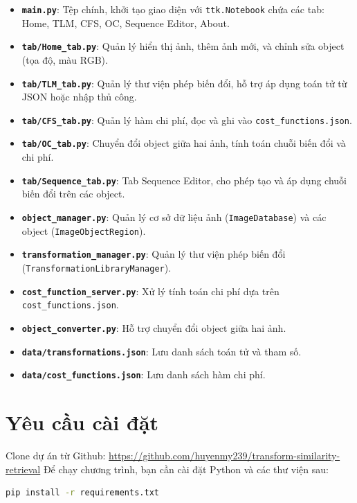 \documentclass[a4paper,12pt]{article}
\begin{document}
\begin{itemize}
    \item \textbf{\texttt{main.py}}: Tệp chính, khởi tạo giao diện với \texttt{ttk.Notebook} chứa các tab: Home, TLM, CFS, OC, Sequence Editor, About.
    \item \textbf{\texttt{tab/Home\_tab.py}}: Quản lý hiển thị ảnh, thêm ảnh mới, và chỉnh sửa object (tọa độ, màu RGB).
    \item \textbf{\texttt{tab/TLM\_tab.py}}: Quản lý thư viện phép biến đổi, hỗ trợ áp dụng toán tử từ JSON hoặc nhập thủ công.
    \item \textbf{\texttt{tab/CFS\_tab.py}}: Quản lý hàm chi phí, đọc và ghi vào \texttt{cost\_functions.json}.
    \item \textbf{\texttt{tab/OC\_tab.py}}: Chuyển đổi object giữa hai ảnh, tính toán chuỗi biến đổi và chi phí.
    \item \textbf{\texttt{tab/Sequence\_tab.py}}: Tab Sequence Editor, cho phép tạo và áp dụng chuỗi biến đổi trên các object.
    \item \textbf{\texttt{object\_manager.py}}: Quản lý cơ sở dữ liệu ảnh (\texttt{ImageDatabase}) và các object (\texttt{ImageObjectRegion}).
    \item \textbf{\texttt{transformation\_manager.py}}: Quản lý thư viện phép biến đổi (\texttt{TransformationLibraryManager}).
    \item \textbf{\texttt{cost\_function\_server.py}}: Xử lý tính toán chi phí dựa trên \texttt{cost\_functions.json}.
    \item \textbf{\texttt{object\_converter.py}}: Hỗ trợ chuyển đổi object giữa hai ảnh.
    \item \textbf{\texttt{data/transformations.json}}: Lưu danh sách toán tử và tham số.
    \item \textbf{\texttt{data/cost\_functions.json}}: Lưu danh sách hàm chi phí.
\end{itemize}

\section{Yêu cầu cài đặt}
Clone dự án từ Github: \href{https://github.com/huyenmy239/transform-similarity-retrieval}{https://github.com/huyenmy239/transform-similarity-retrieval}
Để chạy chương trình, bạn cần cài đặt Python và các thư viện sau:

\begin{lstlisting}[language=bash]
pip install -r requirements.txt
\end{lstlisting}
\end{document}
